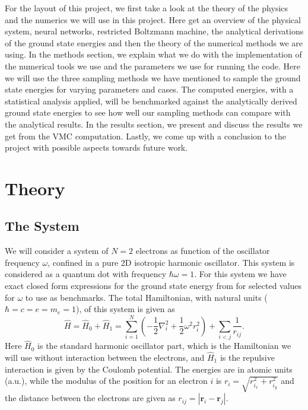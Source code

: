 \documentclass[12pt,a4paper,english]{article}
\begin{document}
For the layout of this project, we first take a look at the theory of the physics and the numerics we will use in this project. Here get an overview of the physical system, neural networks, restricted Boltzmann machine, the analytical derivations of the ground state energies and then the theory of the numerical methods we are using. In the methods section, we explain what we do with the implementation of the numerical tools we use and the parameters we use for running the code. Here we will use the three sampling methods we have mentioned to sample the ground state energies for varying parameters and cases. The computed energies, with a statistical analysis applied, will be benchmarked against the analytically derived ground state energies to see how well our sampling methods can compare with the analytical results. In the results section, we present and discuss the results we get from the VMC computation. Lastly, we come up with a conclusion to the project with possible aspects towards future work.

\section{Theory}
\label{sect:Theory}
\subsection{The System}
\label{subsect:System}
We will consider a system of $N=2$ electrons as function of the oscillator frequency $\omega$, confined in a pure 2D isotropic harmonic oscillator. This system is considered as a quantum dot with frequency $\hbar\omega=1$. For this system we have exact closed form expressions for the ground state energy from \citet{taut1993two} for selected values for $\omega$ to use as benchmarks. The total Hamiltonian, with natural units ($\hbar=c=e=m_e=1$), of this system is given as 
\begin{equation}
\label{eq:Hamlitonian}
\hat{H}=\hat{H}_0+\hat{H}_1=\sum_{i=1}^{N}\left(-\frac{1}{2}\nabla^2_i + \frac{1}{2}\omega^2r_i^2\right) + \sum_{i<j}\frac{1}{r_{ij}}.
\end{equation}
Here $\hat{H}_0$ is the standard harmonic oscillator part, which is the Hamiltonian we will use without interaction between the electrons, and $\hat{H}_1$ is the repulsive interaction is given by the Coulomb potential. The energies are in atomic units (a.u.), while the modulus of the position for an electron $i$ is $r_i=\sqrt{r^2_{i_x}+r^2_{i_y}}$ and the distance between the electrons are given as $r_{ij}=|\textbf{r}_i-\textbf{r}_j|$.
\end{document}
